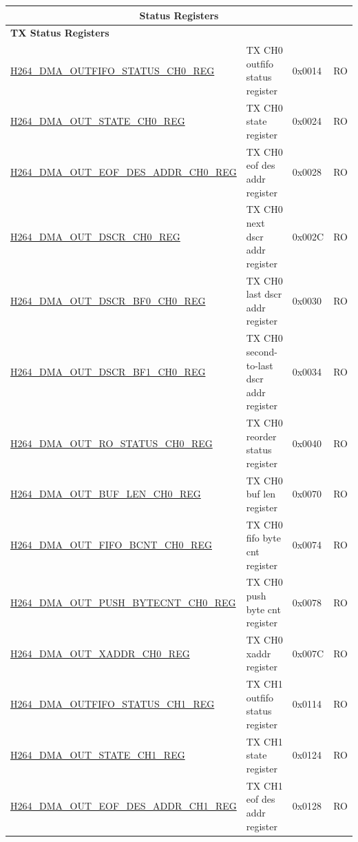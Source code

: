 \begin{longtable}{ | p{7.5cm} | p{5.7cm} | p{1.2cm} | p{1.5cm} | }
\multicolumn{4}{|c|}{\cellcolor{gray!15}\textbf{Status Registers}} \\ \hline
\multicolumn{4}{|l|}{\textbf{TX Status Registers}} \\ \hline
\hyperref[regdesc:H264DMAOUTFIFOSTATUSCH0REG]{H264\_DMA\_OUTFIFO\_STATUS\_CH0\_REG} & TX CH0 outfifo status register & 0x0014 & RO \\ \hline
\hyperref[regdesc:H264DMAOUTSTATECH0REG]{H264\_DMA\_OUT\_STATE\_CH0\_REG} & TX CH0 state register & 0x0024 & RO \\ \hline
\hyperref[regdesc:H264DMAOUTEOFDESADDRCH0REG]{H264\_DMA\_OUT\_EOF\_DES\_ADDR\_CH0\_REG} & TX CH0 eof des addr register & 0x0028 & RO \\ \hline
\hyperref[regdesc:H264DMAOUTDSCRCH0REG]{H264\_DMA\_OUT\_DSCR\_CH0\_REG} & TX CH0 next dscr addr register & 0x002C & RO \\ \hline
\hyperref[regdesc:H264DMAOUTDSCRBF0CH0REG]{H264\_DMA\_OUT\_DSCR\_BF0\_CH0\_REG} & TX CH0 last dscr addr register & 0x0030 & RO \\ \hline
\hyperref[regdesc:H264DMAOUTDSCRBF1CH0REG]{H264\_DMA\_OUT\_DSCR\_BF1\_CH0\_REG} & TX CH0 second-to-last dscr addr register & 0x0034 & RO \\ \hline
\hyperref[regdesc:H264DMAOUTROSTATUSCH0REG]{H264\_DMA\_OUT\_RO\_STATUS\_CH0\_REG} & TX CH0 reorder status register & 0x0040 & RO \\ \hline
\hyperref[regdesc:H264DMAOUTBUFLENCH0REG]{H264\_DMA\_OUT\_BUF\_LEN\_CH0\_REG} & TX CH0 buf len register & 0x0070 & RO \\ \hline
\hyperref[regdesc:H264DMAOUTFIFOBCNTCH0REG]{H264\_DMA\_OUT\_FIFO\_BCNT\_CH0\_REG} & TX CH0 fifo byte cnt register & 0x0074 & RO \\ \hline
\hyperref[regdesc:H264DMAOUTPUSHBYTECNTCH0REG]{H264\_DMA\_OUT\_PUSH\_BYTECNT\_CH0\_REG} & TX CH0 push byte cnt register & 0x0078 & RO \\ \hline
\hyperref[regdesc:H264DMAOUTXADDRCH0REG]{H264\_DMA\_OUT\_XADDR\_CH0\_REG} & TX CH0 xaddr register & 0x007C & RO \\ \hline
\hyperref[regdesc:H264DMAOUTFIFOSTATUSCH1REG]{H264\_DMA\_OUTFIFO\_STATUS\_CH1\_REG} & TX CH1 outfifo status register & 0x0114 & RO \\ \hline
\hyperref[regdesc:H264DMAOUTSTATECH1REG]{H264\_DMA\_OUT\_STATE\_CH1\_REG} & TX CH1 state register & 0x0124 & RO \\ \hline
\hyperref[regdesc:H264DMAOUTEOFDESADDRCH1REG]{H264\_DMA\_OUT\_EOF\_DES\_ADDR\_CH1\_REG} & TX CH1 eof des addr register & 0x0128 & RO \\ \hline

\end{longtable}
